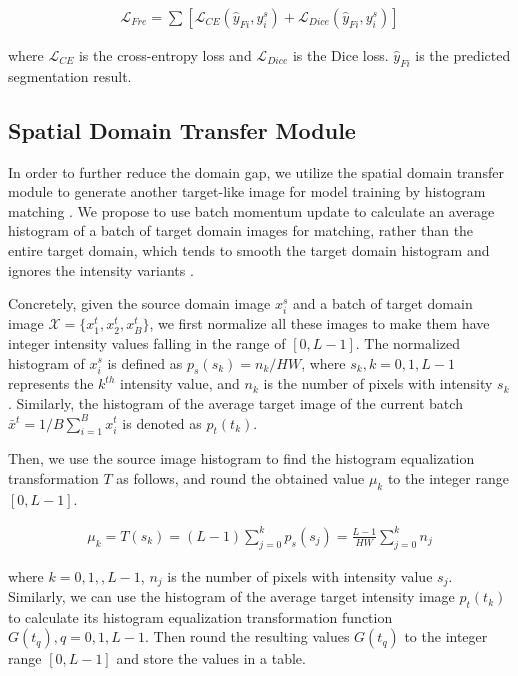 \documentclass[letterpaper]{article} %
\begin{document}
{\small
\begin{align}
    \mathcal{L}_{Fre}=\sum \left[ \mathcal{L}_{CE} \left(\hat{y}_{Fi},y_i^s\right)+ \mathcal{L}_{Dice} \left(\hat{y}_{Fi},y_i^s\right) \right] 
    \label{eq2}
\end{align}
}

\noindent
where $\mathcal{L}_{CE}$ is the cross-entropy loss and $\mathcal{L}_{Dice}$ is the Dice loss. $\hat{y}_{Fi}$ is the predicted segmentation result.

\subsection{Spatial Domain Transfer Module}
In order to further reduce the domain gap, we utilize the spatial domain transfer module to generate another 
target-like image for model training by histogram matching \cite{35}. We propose to use batch momentum update to 
calculate an average histogram of a batch of target domain images for matching, rather than the entire target 
domain, which tends to smooth the target domain histogram and ignores the intensity variants \cite{36}.

Concretely, given the source domain image $x_i^s$ and a batch of target domain image $\mathcal{X}=\{x_1^t,x_2^t,x_B^t\}$, 
we first normalize all these images to make them have integer intensity values falling in the range of $[0,L-1]$. 
The normalized histogram of $x_i^s$ is defined as $p_s(s_k)=n_k/{HW}$, where  $s_k,k=0,1,L-1$ represents the $k^{th}$ 
intensity value, and $n_k$ is the number of pixels with intensity $s_k$. Similarly, the histogram of the average target 
image of the current batch $\bar{x}^t  =1/B \sum_{i=1}^{B}x_i^t$  is denoted as $p_t(t_k)$. 

Then, we use the source image histogram to find the histogram equalization transformation $T$ as follows, and 
round the obtained value ${\mu}_k$ to the integer range $[0,L-1]$.

{\small  
\begin{align}
    {\mu}_k=T\left(s_k\right)=\left(L-1\right) \sum_{j=0}^{k}{p_s(s_j)}=\frac{L-1}{HW}\sum_{j=0}^{k}{n_j}\label{eq3}
\end{align}
}

\noindent
where $k=0,1,,L-1$, $n_j$ is the number of pixels with intensity value $s_j$. 
Similarly, we can use the histogram of the average target intensity image $p_t(t_k)$ to calculate its histogram 
equalization transformation function $G(t_q),q=0,1,L-1$. Then round the resulting values $G(t_q)$ to the integer range 
$[0,L-1]$ and store the values in a table.
\end{document}
